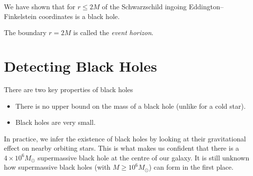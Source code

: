 We have shown that for $r \leq 2M$ of the Schwarzschild ingoing Eddington--Finkelstein coordinates is a black hole.
\begin{definition}
  The boundary $r = 2M$ is called the \emph{event horizon}.
\end{definition}

\section{Detecting Black Holes}%
\label{sec:detecting_black_holes}

There are two key properties of black holes
\begin{itemize}
  \item There is no upper bound on the mass of a black hole (unlike for a cold star).
  \item Black holes are very small.
\end{itemize}
In practice, we infer the existence of black holes by looking at their gravitational effect on nearby orbiting stars.
This is what makes us confident that there is a $4 \times 10^6 M_{\odot}$ supermassive black hole at the centre of our galaxy.
It is still unknown how supermassive black holes (with $M \geq 10^6 M_\odot$) can form in the first place.

